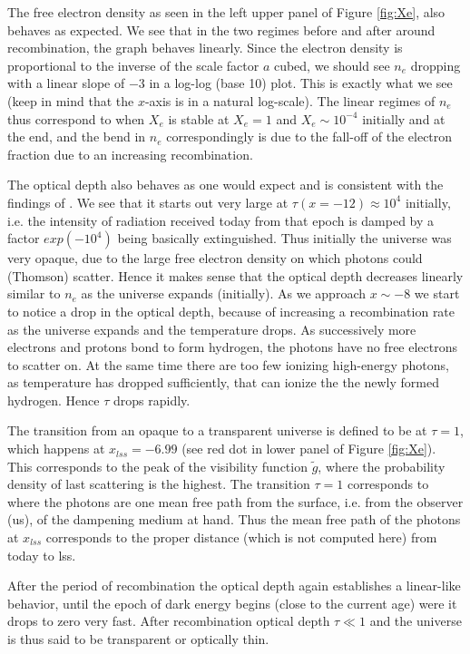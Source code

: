 \documentclass[twocolumn]{aastex62}
\begin{document}
The free electron density as seen in the left upper panel of Figure \ref{fig:Xe}, also behaves as expected. We see that in the two regimes before and after around recombination, the graph behaves linearly. Since the electron density is proportional to the inverse of the scale factor $a$ cubed, we should see $n_e$ dropping with a linear slope of $-3$ in a log-log (base 10) plot. This is exactly what we see (keep in mind that the $x$-axis is in a natural log-scale). The linear regimes of $n_e$ thus correspond to when $X_e$ is stable at $X_e = 1$ and $X_e\sim 10^{-4}$ initially and at the end, and the bend in $n_e$ correspondingly is due to the fall-off of the electron fraction due to an increasing recombination. 

The optical depth also behaves as one would expect and is consistent with the findings of \cite{callin:2006}. We see that it starts out very large at $\tau(x = -12) \approx 10^4$ initially, i.e. the intensity of radiation received today from that epoch is damped by a factor $exp(-10^4)$ being basically extinguished. Thus initially the universe was very opaque, due to the large free electron density on which photons could (Thomson) scatter. Hence it makes sense that the optical depth decreases linearly similar to $n_e$ as the universe expands (initially). As we approach $x\sim -8$ we start to notice a drop in the optical depth, because of increasing a recombination rate as the universe expands and the temperature drops. As successively more electrons and protons bond to form hydrogen, the photons have no free electrons to scatter on. At the same time there are too few ionizing high-energy photons, as temperature has dropped sufficiently, that can ionize the the newly formed hydrogen. Hence $\tau$ drops rapidly.

The transition from an opaque to a transparent universe is defined to be at $\tau = 1$, which happens at $x_{lss} = -6.99$ (see red dot in lower panel of Figure \ref{fig:Xe}). This corresponds to the peak of the visibility function $\tilde{g}$, where the probability density of last scattering is the highest. The transition $\tau = 1$ corresponds to where the photons are one mean free path from the surface, i.e. from the observer (us), of the dampening medium at hand. Thus the mean free path of the photons at $x_{lss}$ corresponds to the proper distance (which is not computed here) from today to lss. 

After the period of recombination the optical depth again establishes a linear-like behavior, until the epoch of dark energy begins (close to the current age) were it drops to zero very fast. After recombination optical depth $\tau \ll 1$ and the universe is thus said to be transparent or optically thin.
\end{document}
